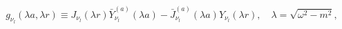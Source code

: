 \begin{equation}
g_{\nu _{l}}(\lambda a,\lambda r)\equiv J_{\nu _{l}}(\lambda r)\bar{Y}_{\nu
_{l}}^{(a)}(\lambda a)-\bar{J}_{\nu _{l}}^{(a)}(\lambda a)Y_{\nu
_{l}}(\lambda r),\quad \lambda =\sqrt{\omega ^{2}-m^{2}},  \label{genu}
\end{equation}

